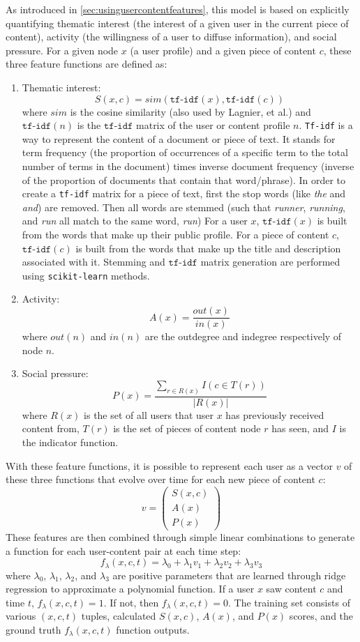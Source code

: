 As introduced in \ref{sec:usingusercontentfeatures}, this model is based on explicitly quantifying thematic interest (the interest of a given user in the current piece of content), activity (the willingness of a user to diffuse information), and social pressure.  For a given node $x$ (a user profile) and a given piece of content $c$, these three feature functions are defined as:
\begin{enumerate}
	\item Thematic interest: $$S(x, c) = sim(\texttt{tf-idf}(x), \texttt{tf-idf}(c))$$ where $sim$ is the cosine similarity (also used by Lagnier, et al.) and $\texttt{tf-idf}(n)$ is the $\texttt{tf-idf}$ matrix of the user or content profile $n$.  \texttt{Tf-idf} is a way to represent the content of a document or piece of text.  It stands for term frequency (the proportion of occurrences of a specific term to the total number of terms in the document) times inverse document frequency (inverse of the proportion of documents that contain that word/phrase).  In order to create a \texttt{tf-idf} matrix for a piece of text, first the stop words (like \textit{the} and \textit{and}) are removed.  Then all words are stemmed (such that \textit{runner}, \textit{running}, and \textit{run} all match to the same word, \textit{run}) For a user $x$, $\texttt{tf-idf}(x)$ is built from the words that make up their public profile.  For a piece of content $c$, $\texttt{tf-idf}(c)$ is built from the words that make up the title and description associated with it.  Stemming and $\texttt{tf-idf}$ matrix generation are performed using \texttt{scikit-learn} methods.
	\item Activity: $$A(x) = \frac{out(x)}{in(x)}$$ where $out(n)$ and $in(n)$ are the outdegree and indegree respectively of node $n$.	
	\item Social pressure: $$P(x) = \frac{\sum_{r \in R(x)} I(c \in T(r))}{|R(x)|}$$ where $R(x)$ is the set of all users that user $x$ has previously received content from, $T(r)$ is the set of pieces of content node $r$ has seen, and $I$ is the indicator function.
\end{enumerate}
With these feature functions, it is possible to represent each user as a vector $v$ of these three functions that evolve over time for each new piece of content $c$:
$$v = \begin{pmatrix} S(x, c) \\ A(x) \\ P(x) \end{pmatrix}$$
These features are then combined through simple linear combinations to generate a function for each user-content pair at each time step:
$$f_\lambda(x, c, t) = \lambda_0 + \lambda_1v_1 + \lambda_2v_2 + \lambda_3v_3$$
where $\lambda_0$, $\lambda_1$, $\lambda_2$, and $\lambda_3$ are positive parameters that are learned through ridge regression to approximate a polynomial function.  If a user $x$ saw content $c$ and time $t$, $f_\lambda(x, c, t) = 1$.  If not, then $f_\lambda(x, c, t) = 0$.  The training set consists of various $(x, c, t)$ tuples, calculated $S(x, c)$, $A(x)$, and $P(x)$ scores, and the ground truth $f_\lambda(x, c, t)$ function outputs.

